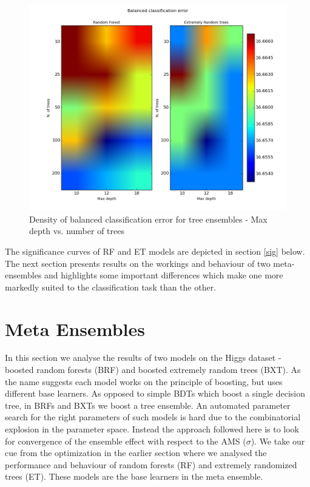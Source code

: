 \begin{figure}[h]
\includegraphics[scale=0.6]{images/Grid_error_depth_trees_rf_et.png}
\caption{Density of balanced classification error for tree ensembles - Max depth vs. number of trees}
\label{tree_num_features}
\end{figure}

The significance curves of RF and ET models are depicted in section \ref{sig} below. The next section presents results on the workings and behaviour of two meta-ensembles and highlights some important differences which make one more markedly suited to the classification task than the other. 
  
\section{Meta Ensembles}

In this section we analyse the results of two models on the Higgs dataset - boosted random forests (BRF) and boosted extremely random trees (BXT). As the name suggests each model works on the principle of boosting, but uses different base learners. As opposed to simple BDTs which boost a single decision tree, in BRFs and BXTs we boost a tree ensemble. An automated parameter search for the right parameters of such models is hard due to the combinatorial explosion in the parameter space. Instead the approach followed here is to look for convergence of the ensemble effect with respect to the AMS ($\sigma$).  We take our cue from the optimization in the earlier section where we analysed the performance and behaviour of random forests (RF) and extremely randomized trees (ET). These models are the base learners in the meta ensemble.  

